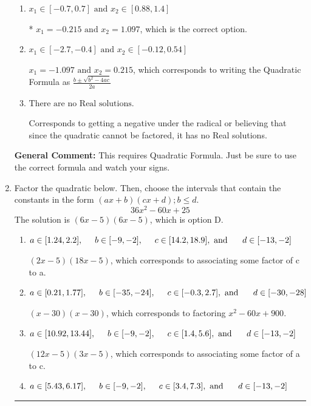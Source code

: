 \documentclass{extbook}[14pt]
\newcommand{\litem}[1]{\item #1

\rule{\textwidth}{0.4pt}}
\begin{document}
\begin{enumerate}
{\begin{enumerate}[label=\Alph*.]
 $x_1 = -18.647 \text{ and } x_2 = 3.647$, which corresponds to using the Quadratic Formula with $a=1$
\item \( x_1 \in [-0.7, 0.7] \text{ and } x_2 \in [0.88, 1.4] \)

* $x_1 = -0.215 \text{ and } x_2 = 1.097$, which is the correct option.
\item \( x_1 \in [-2.7, -0.4] \text{ and } x_2 \in [-0.12, 0.54] \)

 $x_1 = -1.097 \text{ and } x_2 = 0.215$, which corresponds to writing the Quadratic Formula as $\frac{b \pm \sqrt{b^2 - 4ac}}{2a}$
\item \( \text{There are no Real solutions.} \)

Corresponds to getting a negative under the radical or believing that since the quadratic cannot be factored, it has no Real solutions.
\end{enumerate}

\textbf{General Comment:} This requires Quadratic Formula. Just be sure to use the correct formula and watch your signs.
}
\litem{
Factor the quadratic below. Then, choose the intervals that contain the constants in the form $(ax+b)(cx+d); b \leq d.$
\[ 36x^{2} -60 x + 25 \]The solution is \( (6x -5)(6x -5) \), which is option D.\begin{enumerate}[label=\Alph*.]
\item \( a \in [1.24, 2.2], \hspace*{5mm} b \in [-9, -2], \hspace*{5mm} c \in [14.2, 18.9], \text{ and } \hspace*{5mm} d \in [-13, -2] \)

 $(2x -5)(18x -5)$, which corresponds to associating some factor of c to a.
\item \( a \in [0.21, 1.77], \hspace*{5mm} b \in [-35, -24], \hspace*{5mm} c \in [-0.3, 2.7], \text{ and } \hspace*{5mm} d \in [-30, -28] \)

 $(x -30)(x -30)$, which corresponds to factoring $x^{2} -60 x + 900$.
\item \( a \in [10.92, 13.44], \hspace*{5mm} b \in [-9, -2], \hspace*{5mm} c \in [1.4, 5.6], \text{ and } \hspace*{5mm} d \in [-13, -2] \)

 $(12x -5)(3x -5)$, which corresponds to associating some factor of a to c.
\item \( a \in [5.43, 6.17], \hspace*{5mm} b \in [-9, -2], \hspace*{5mm} c \in [3.4, 7.3], \text{ and } \hspace*{5mm} d \in [-13, -2] \)


\end{enumerate}}
\end{enumerate}
\end{document}

